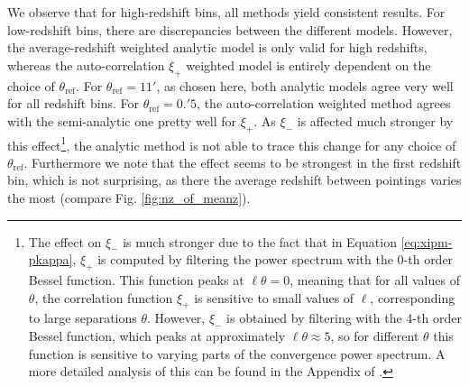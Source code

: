\documentclass{aa}
\renewcommand{\rm}{\mathrm}
\begin{document}
We observe that for high-redshift bins, all methods yield consistent results. For low-redshift bins, there are discrepancies between the different models. However, the average-redshift weighted analytic model is only valid for high redshifts, whereas the auto-correlation $\xi_+$ weighted model is entirely dependent on the choice of $\theta_{\rm{ref}}$. For $\theta_{\rm{ref}}=11'$, as chosen here, both analytic models agree very well for all redshift bins. For $\theta_{\rm{ref}}=0.\!'5$, the auto-correlation weighted method agrees with the semi-analytic one pretty well for $\xi_+$. As $\xi_-$ is affected much stronger by this effect\footnote{The effect on $\xi_-$ is much stronger due to the fact that in Equation \eqref{eq:xipm-pkappa}, $\xi_+$ is computed by filtering the power spectrum with the 0-th order Bessel function. This function peaks at $\ell\theta=0$, meaning that for all values of $\theta$, the correlation function $\xi_+$ is sensitive to small values of $\ell$, corresponding to large separations $\theta$. However, $\xi_-$ is obtained by filtering with the 4-th order Bessel function, which peaks at approximately $\ell\theta\approx 5$, so for different $\theta$ this function is sensitive to varying parts of the convergence power spectrum. A more detailed analysis of this can be found in the Appendix of \citet{2017MNRAS.471.4412K}.}, the analytic method is not able to trace this change for any choice of $\theta_{\rm{ref}}$. Furthermore we note that the effect seems to be strongest in the first redshift bin, which is not surprising, as there the average redshift between pointings varies the most (compare Fig. \ref{fig:nz_of_meanz}).
\end{document}
